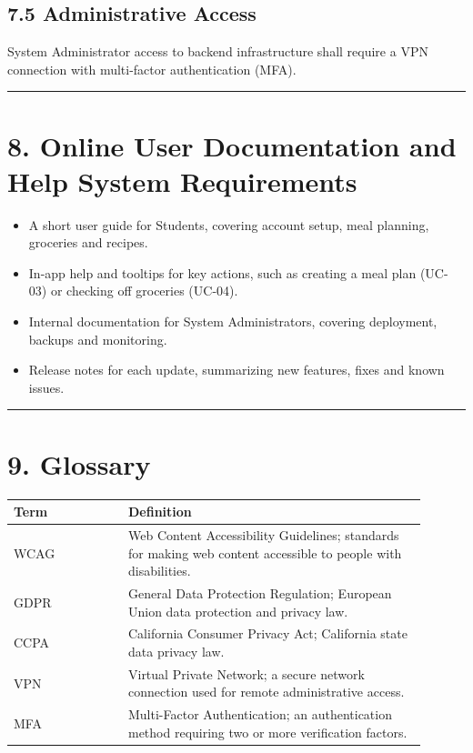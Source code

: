 \documentclass[10pt,letterpaper]{article}
\newcommand{\ucseparator}{\vspace{1em}\noindent\rule{\linewidth}{0.4pt}\vspace{1.5em}}
\begin{document}
\subsection*{7.5 Administrative Access}
System Administrator access to backend infrastructure shall require a VPN connection with multi-factor authentication (MFA).

\ucseparator

\section*{8. Online User Documentation and Help System Requirements}

\begin{itemize}
    \item A short user guide for Students, covering account setup, meal planning, groceries and recipes.
    \item In-app help and tooltips for key actions, such as creating a meal plan (UC-03) or checking off groceries (UC-04).
    \item Internal documentation for System Administrators, covering deployment, backups and monitoring.
    \item Release notes for each update, summarizing new features, fixes and known issues.
\end{itemize}

\ucseparator

\section*{9. Glossary}

\begin{longtable}{|p{0.25\linewidth}|p{0.65\linewidth}|}
\hline
\textbf{Term} & \textbf{Definition} \\
\hline
WCAG & Web Content Accessibility Guidelines; standards for making web content accessible to people with disabilities. \\
\hline
GDPR & General Data Protection Regulation; European Union data protection and privacy law. \\
\hline
CCPA & California Consumer Privacy Act; California state data privacy law. \\
\hline
VPN & Virtual Private Network; a secure network connection used for remote administrative access. \\
\hline
MFA & Multi-Factor Authentication; an authentication method requiring two or more verification factors. \\
\hline
\end{longtable}
\end{document}
